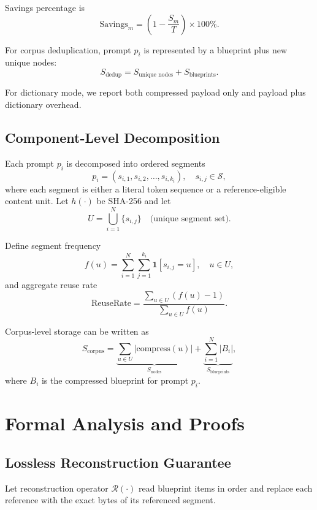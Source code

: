 \documentclass[10pt,conference]{IEEEtran}
\begin{document}
Savings percentage is
\begin{equation}
\text{Savings}_m = \left(1-\frac{S_m}{T}\right)\times 100\%.
\end{equation}

For corpus deduplication, prompt $p_i$ is represented by a blueprint plus new unique nodes:
\begin{equation}
S_{\text{dedup}} = S_{\text{unique nodes}} + S_{\text{blueprints}}.
\end{equation}

For dictionary mode, we report both compressed payload only and payload plus dictionary overhead.

\subsection{Component-Level Decomposition}
Each prompt $p_i$ is decomposed into ordered segments
\begin{equation}
p_i = (s_{i,1}, s_{i,2}, \dots, s_{i,k_i}), \quad s_{i,j} \in \mathcal{S},
\end{equation}
where each segment is either a literal token sequence or a reference-eligible content unit. Let $h(\cdot)$ be SHA-256 and let
\begin{equation}
U = \bigcup_{i=1}^{N}\{s_{i,j}\} \quad \text{(unique segment set)}.
\end{equation}

Define segment frequency
\begin{equation}
f(u)=\sum_{i=1}^{N}\sum_{j=1}^{k_i} \mathbf{1}[s_{i,j}=u], \quad u\in U,
\end{equation}
and aggregate reuse rate
\begin{equation}
\text{ReuseRate}=\frac{\sum_{u\in U}(f(u)-1)}{\sum_{u\in U}f(u)}.
\end{equation}

Corpus-level storage can be written as
\begin{equation}
S_{\text{corpus}} = \underbrace{\sum_{u\in U}|\text{compress}(u)|}_{S_{\text{nodes}}} + \underbrace{\sum_{i=1}^{N}|B_i|}_{S_{\text{blueprints}}},
\end{equation}
where $B_i$ is the compressed blueprint for prompt $p_i$.

\section{Formal Analysis and Proofs}
\subsection{Lossless Reconstruction Guarantee}
Let reconstruction operator $\mathcal{R}(\cdot)$ read blueprint items in order and replace each reference with the exact bytes of its referenced segment.
\end{document}
